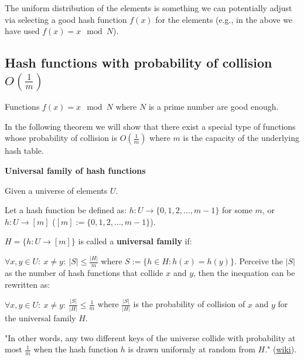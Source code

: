 The uniform distribution of the elements is something we can potentially adjust via selecting a good hash function $f(x)$ for the elements (e.g., in the above we have used $f(x) = x \mod N$).



\subsection{Hash functions with probability of collision $O(\frac{1}{m})$}

\begin{statement}

    Functions $f(x) = x \mod N$ where $N$ is a prime number are good enough.

\end{statement}

In the following theorem we will show that there exist a special type of functions whose probability of collision is $O(\frac{1}{m})$ where $m$ is the capacity of the underlying hash table.

\begin{definition} \textbf{Universal family of hash functions}

    Given a universe of elements $U$.

    Let a hash function be defined as: $h: U \to \{0, 1, 2, ..., m-1\}$ for some $m$, or $h: U \to [m]$ ($[m] := \{0, 1, 2, ..., m-1\}$).

    $H = \{h: U \to [m]\}$ is called a \textbf{universal family} if:

    $\forall x, y \in U: \ x \neq y: \ |S| \leq \frac{|H|}{m}$ where $S := \{h \in H: h(x) = h(y)\}$. Perceive the $|S|$ as the number of hash functions that collide $x$ and $y$, then the inequation can be rewritten as:

    $\forall x, y \in U: \ x \neq y: \ \frac{|S|}{|H|} \leq \frac{1}{m}$ where $\frac{|S|}{|H|}$ is the probability of collision of $x$ and $y$ for the universal family $H$.

    "In other words, any two different keys of the universe collide with probability at most $\frac{1}{m}$ when the hash function $h$ is drawn uniformly at random from $H$." (\href{https://en.wikipedia.org/wiki/Universal_hashing}{wiki}).

\end{definition}


